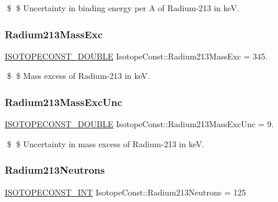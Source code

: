 \$ \$ Uncertainty in binding energy per A of Radium-\/213 in keV. \mbox{\label{group___isotope_const-_radium-_ra213_gae96fadeafa9c13b36a8403ea6c4d02ef}} 
\subsubsection{\texorpdfstring{Radium213\+Mass\+Exc}{Radium213MassExc}}
{\footnotesize\ttfamily \mbox{\hyperlink{group___isotope_const-_macros_ga8f45a7272ce02c0b4c65c44636ed719a}{I\+S\+O\+T\+O\+P\+E\+C\+O\+N\+S\+T\+\_\+\+D\+O\+U\+B\+LE}} Isotope\+Const\+::\+Radium213\+Mass\+Exc = 345.}

\$ \$ Mass excess of Radium-\/213 in keV. \mbox{\label{group___isotope_const-_radium-_ra213_gafb4661a8d89a26837f8cbecf10fdb134}} 
\subsubsection{\texorpdfstring{Radium213\+Mass\+Exc\+Unc}{Radium213MassExcUnc}}
{\footnotesize\ttfamily \mbox{\hyperlink{group___isotope_const-_macros_ga8f45a7272ce02c0b4c65c44636ed719a}{I\+S\+O\+T\+O\+P\+E\+C\+O\+N\+S\+T\+\_\+\+D\+O\+U\+B\+LE}} Isotope\+Const\+::\+Radium213\+Mass\+Exc\+Unc = 9.}

\$ \$ Uncertainty in mass excess of Radium-\/213 in keV. \mbox{\label{group___isotope_const-_radium-_ra213_ga0e956b3c40d18dd9dcc6dab845d2a17b}} 
\subsubsection{\texorpdfstring{Radium213\+Neutrons}{Radium213Neutrons}}
{\footnotesize\ttfamily \mbox{\hyperlink{group___isotope_const-_macros_ga5f18360b3e99483a35c32d789e62621c}{I\+S\+O\+T\+O\+P\+E\+C\+O\+N\+S\+T\+\_\+\+I\+NT}} Isotope\+Const\+::\+Radium213\+Neutrons = 125}

